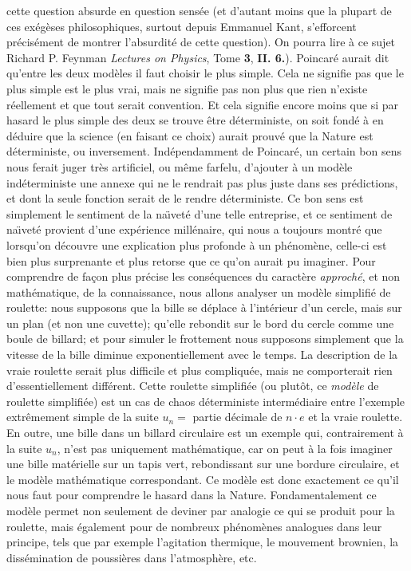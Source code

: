 cette question absurde en question sens\'ee (et d'autant moins que 
la plupart de ces ex\'eg\`eses philosophiques, surtout depuis 
Emmanuel Kant, s'efforcent pr\'ecis\'ement de montrer l'absurdit\'e 
de cette question). On pourra lire \`a ce sujet Richard P. Feynman 
{\it Lectures on Physics}, Tome {\bf 3}, {\bf II. 6.}). 
\medskip
Poincar\'e aurait dit qu'entre les deux mod\`eles il faut choisir le plus   
simple. Cela ne signifie pas que le plus simple est le plus vrai, mais 
ne signifie pas non plus que rien n'existe r\'eellement et que tout  
serait convention. Et cela signifie encore moins que si par hasard le 
plus simple des deux se trouve \^etre d\'eterministe, on soit fond\'e \`a  
en d\'eduire que la science (en  faisant ce choix) aurait prouv\'e que la 
Nature est d\'eterministe, ou inversement. Ind\'ependamment de 
Poincar\'e, un certain bon sens nous ferait juger tr\`es artificiel, ou 
m\^eme farfelu, d'ajouter \`a un mod\`ele ind\'eterministe une annexe qui 
ne le rendrait pas plus juste dans ses pr\'edictions, et dont la seule 
fonction serait de le rendre  d\'eterministe. Ce bon sens est simplement 
le sentiment de la na\"\i vet\'e d'une telle entreprise, et ce sentiment de 
na\"\i vet\'e  provient d'une exp\'erience mill\'enaire, qui  nous a 
toujours montr\'e que lorsqu'on d\'ecouvre une explication plus profonde 
\`a un ph\'enom\`ene, celle-ci est bien plus surprenante et plus retorse 
que ce qu'on aurait pu imaginer. 
\medskip 
Pour comprendre de fa\c con plus pr\'ecise les cons\'equences du 
caract\`ere {\it approch\'e}, et non math\'ematique, de la connaissance,  
nous allons analyser  un mod\`ele simplifi\'e de roulette: nous supposons 
que la bille se d\'eplace \`a l'int\'erieur d'un cercle, mais sur un plan (et 
non une cuvette); qu'elle rebondit sur le bord du cercle comme une boule  
de billard; et pour simuler le frottement nous supposons simplement que  
la vitesse de la bille diminue exponentiellement avec le temps. La 
description de la vraie roulette serait plus difficile et plus 
compliqu\'ee, mais ne comporterait rien d'essentiellement diff\'erent. 
\medskip 
Cette roulette simplifi\'ee (ou plut\^ot, ce {\it mod\`ele} de roulette  
simplifi\'ee) est un cas de chaos d\'eterministe interm\'ediaire entre 
l'exemple extr\^emement simple de la suite $u_n = $ partie d\'ecimale  
de $n \cdot e$ et la vraie roulette. En outre, une bille dans un billard 
circulaire est un exemple qui, contrairement \`a la suite $u_n$, n'est 
pas uniquement math\'ematique, car on peut \`a la fois imaginer une  
bille mat\'erielle sur un tapis vert, rebondissant sur  une bordure 
circulaire, et le mod\`ele math\'ematique correspondant. Ce mod\`ele est 
donc exactement ce qu'il nous faut pour comprendre le hasard dans la 
Nature. Fondamentalement ce mod\`ele  permet non seulement de deviner 
par analogie ce qui se produit pour la roulette, mais \'egalement pour de 
nombreux ph\'enom\`enes analogues dans leur principe, tels que par 
exemple l'agitation thermique, le mouvement brownien, la 
diss\'emination de poussi\`eres dans l'atmosph\`ere, etc.   
\medskip 
 
